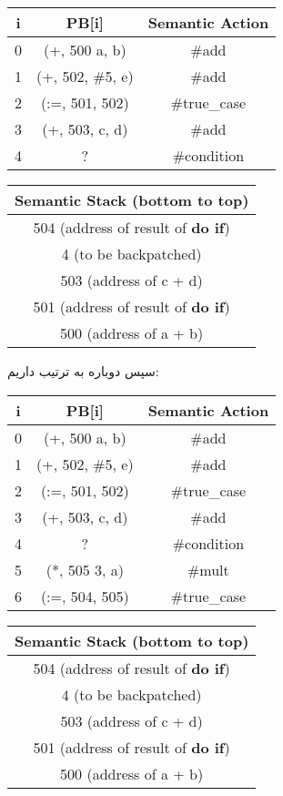 \documentclass[]{article}
\begin{document}
\begin{latin}
\centering
\begin{tabular}{|c|c|c|}
    \hline
    i & PB[i] & Semantic Action\\
    \hline
    0 & (+, 500 a, b) & \#add\\
    1 & (+, 502, \#5, e) & \#add\\
    2 & (:=, 501, 502) & \#true\_case\\
    3 & (+, 503, c, d) & \#add\\
    4 & ? & \#condition\\
    \hline
\end{tabular}
\begin{tabular}{|c|}
    \hline
    Semantic Stack (bottom to top)\\
    \hline
    504 (address of result of \textbf{do if})\\
    \hline
    4 (to be backpatched)\\
    \hline
    503 (address of c + d)\\
    \hline
    501 (address of result of \textbf{do if})\\
    \hline
    500 (address of a + b)\\
    \hline
\end{tabular}
\end{latin}
سپس دوباره به ترتیب داریم:
\begin{latin}
\centering
\begin{tabular}{|c|c|c|}
    \hline
    i & PB[i] & Semantic Action\\
    \hline
    0 & (+, 500 a, b) & \#add\\
    1 & (+, 502, \#5, e) & \#add\\
    2 & (:=, 501, 502) & \#true\_case\\
    3 & (+, 503, c, d) & \#add\\
    4 & ? & \#condition\\
    5 & (*, 505 3, a) & \#mult\\
    6 & (:=, 504, 505) & \#true\_case\\
    \hline
\end{tabular}
\begin{tabular}{|c|}
    \hline
    Semantic Stack (bottom to top)\\
    \hline
    504 (address of result of \textbf{do if})\\
    \hline
    4 (to be backpatched)\\
    \hline
    503 (address of c + d)\\
    \hline
    501 (address of result of \textbf{do if})\\
    \hline
    500 (address of a + b)\\
    \hline
\end{tabular}
\end{latin}
\end{document}
